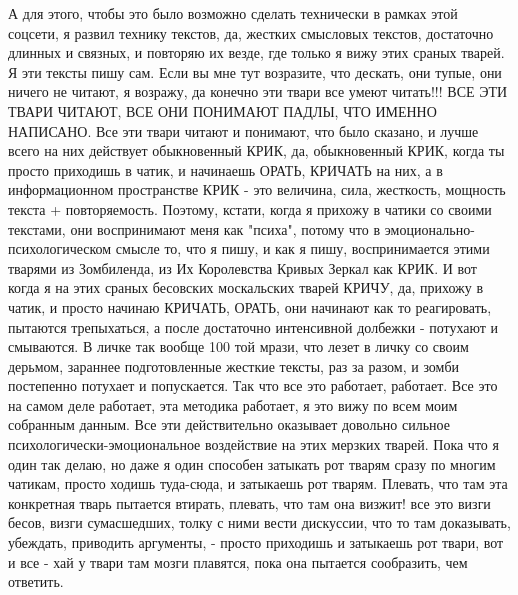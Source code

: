 А для этого, чтобы это было возможно сделать технически в рамках этой соцсети,
я развил технику текстов, да, жестких смысловых текстов, достаточно длинных и
связных, и повторяю их везде, где только я вижу этих сраных тварей. Я эти
тексты пишу сам. Если вы мне тут возразите, что дескать, они тупые, они ничего
не читают, я возражу, да конечно эти твари все умеют читать!!! ВСЕ ЭТИ ТВАРИ
ЧИТАЮТ, ВСЕ ОНИ ПОНИМАЮТ ПАДЛЫ, ЧТО ИМЕННО НАПИСАНО. Все эти твари читают и
понимают, что было сказано, и лучше всего на них действует обыкновенный КРИК,
да, обыкновенный КРИК, когда ты просто приходишь в чатик, и начинаешь ОРАТЬ,
КРИЧАТЬ на них, а в информационном пространстве КРИК - это величина, сила,
жесткость, мощность текста + повторяемость. Поэтому, кстати, когда я прихожу в
чатики со своими текстами, они воспринимают меня как "психа", потому что в
эмоционально-психологическом смысле то, что я пишу, и как я пишу,
воспринимается этими тварями из Зомбиленда, из Их Королевства Кривых Зеркал как
КРИК. И вот когда я на этих сраных бесовских москальских тварей КРИЧУ, да,
прихожу в чатик, и просто начинаю КРИЧАТЬ, ОРАТЬ, они начинают как то
реагировать, пытаются трепыхаться, а после достаточно интенсивной долбежки -
потухают и смываются. В личке так вообще 100%
той мрази, что лезет в личку со своим дерьмом, зараннее подготовленные жесткие
тексты, раз за разом, и зомби постепенно потухает и попускается. Так что все
это работает, работает. Все это на самом деле работает, эта методика работает,
я это вижу по всем моим собранным данным. Все эти действительно оказывает
довольно сильное психологически-эмоциональное воздействие на этих мерзких
тварей. Пока что я один так делаю, но даже я один способен затыкать рот тварям
сразу по многим чатикам, просто ходишь туда-сюда, и затыкаешь рот тварям.
Плевать, что там эта конкретная тварь пытается втирать, плевать, что там она
визжит! все это визги бесов, визги сумасшедших, толку с ними вести дискуссии,
что то там доказывать, убеждать, приводить аргументы, - просто приходишь и
затыкаешь рот твари, вот и все - хай у твари там мозги плавятся, пока она
пытается сообразить, чем ответить. 
